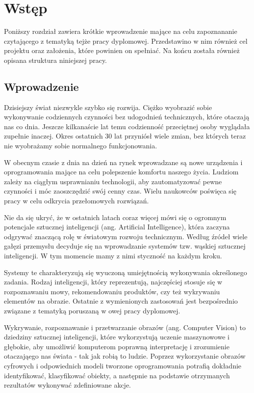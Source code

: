 \chapter{Wstęp}
\label{cha:wstep}
Poniższy rozdział zawiera krótkie wprowadzenie mające na celu zapoznananie czytającego z tematyką tejże pracy dyplomowej. Przedstawino w nim również cel projektu oraz założenia, które powinien on spełniać. Na końcu została również opisana struktura niniejszej pracy.

\section{Wprowadzenie}
Dzisiejszy świat niezwykle szybko się rozwija. Ciężko wyobrazić sobie wykonywanie codziennych czynności bez udogodnień technicznych, które otaczają nas co dnia. Jeszcze kilkanaście lat temu codzienność przeciętnej 
osoby wyglądała zupełnie inaczej. Okres ostatnich 30 lat przyniósł wiele zmian, bez których teraz nie wyobrażamy sobie normalnego funkcjonowania.

W obecnym czasie z dnia na dzień na rynek wprowadzane są nowe urządzenia i oprogramowania mające na celu polepszenie komfortu naszego życia. Ludziom zależy na ciągłym usprawnianiu technologii, aby zautomatyzować pewne czynności i móc zaoszczędzić swój cenny czas. Wielu naukowców poświęca się pracy w celu odkrycia przełomowych rozwiązań.

Nie da się ukryć, że w ostatnich latach coraz więcej mówi się o ogromnym potencjale sztucznej inteligencji (ang. Artificial Intelligence), która zaczyna odgrywać znaczącą rolę w światowym rozwoju technicznym. Według źródeł wiele gałęzi przemysłu decyduje się na wprowadzanie systemów tzw. wąskiej sztucznej inteligencji. W tym momencie mamy z nimi styczność na każdym kroku.\cite{ai}   

Systemy te charakteryzują się wyuczoną umiejętnością wykonywania określonego zadania. Rodzaj inteligencji, który reprezentują, najczęściej stosuje się w rozpoznawaniu mowy, rekomendowaniu produktów, czy też wykrywaniu elementów na obrazie. Ostatnie z wymienionych zastosowań jest bezpośrednio związane z tematyką poruszaną w owej pracy dyplomowej.

Wykrywanie, rozpoznawanie i przetwarzanie obrazów (ang. Computer Vision) to dziedziny sztucznej inteligencji, które wykorzystują uczenie maszynowowe i głębokie, aby umożliwić komputerom poprawną interpretację i zrozumienie otaczająego nas świata - tak jak robią to ludzie. Poprzez wykorzystanie obrazów cyfrowych i odpowiednich modeli tworzone oprogramowania potrafią dokładnie identyfikować, klasyfikować obiekty, a następnie na podstawie otrzymanych rezultatów wykonywać zdefiniowane akcje. \cite{computervision}

